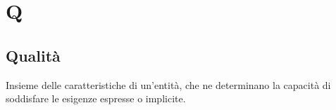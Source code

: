 \section{Q}

    \subsection{Qualità}
    \label{glossario:qualita}
    Insieme delle caratteristiche di un'entità, che ne determinano la capacità di soddisfare le esigenze espresse o implicite.

\pagebreak